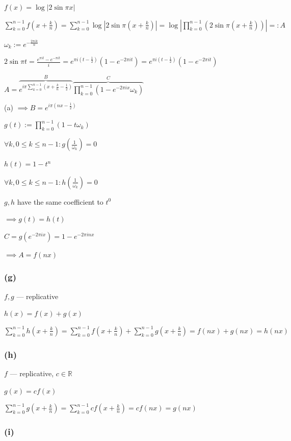 \documentclass{article}
\begin{document}
\( f(x) = \log |2 \sin \pi x | \)

\( \sum_{k=0}^{n-1} f(x+\frac{k}{n}) = \sum_{k=0}^{n-1} \log |2 \sin \pi (x + \frac{k}{n})| = \log |\prod_{k=0}^{n-1}(2\sin \pi (x + \frac{k}{n}))| =: A \)

\( \omega_{k} := e^{-\frac{2\pi i k}{n}} \)

\( 2\sin \pi t = \frac{e^{\pi i t}-e^{-\pi i t}}{i} = e^{\pi i (t - \frac{1}{2})}(1-e^{-2\pi i t}) = e^{\pi i (t - \frac{1}{2})}(1-e^{-2\pi i t}) \)

\( A = \overbrace{e^{i \pi \sum_{k=0}^{n-1}(x+\frac{k}{n}-\frac{1}{2})}}^{B} \overbrace{\prod_{k=0}^{n-1} (1-e^{-2\pi i x}\omega_{k})}^{C} \)

(a) \( \implies B = e^{i \pi (nx - \frac{1}{2})} \)

\( g(t) := \prod_{k=0}^{n-1} (1-t\omega_{k}) \)

\( \forall k, 0 \leq k \leq n - 1: g(\frac{1}{\omega_{k}}) = 0 \)

\( h(t) = 1-t^{n} \)

\( \forall k, 0 \leq k \leq n - 1: h(\frac{1}{\omega_{k}}) = 0 \)

\( g, h \) have the same coefficient to \( t^{0} \)

\( \implies g(t) = h(t) \)

\( C = g(e^{-2\pi i x}) = 1 - e^{-2\pi i n x} \)

\( \implies A = f(nx) \)

\subsubsection*{(g)}

\( f, g \) --- replicative

\( h(x) = f(x) + g(x) \)

\( \sum_{k=0}^{n-1} h(x+\frac{k}{n}) = \sum_{k=0}^{n-1} f(x+\frac{k}{n}) + \sum_{k=0}^{n-1} g(x+\frac{k}{n}) = f(nx) + g(nx) = h(nx) \)

\subsubsection*{(h)}

\( f \) --- replicative, \( c \in \mathbb{R} \)

\( g(x) = cf(x) \)

\( \sum_{k=0}^{n-1} g(x+\frac{k}{n}) = \sum_{k=0}^{n-1} cf(x+\frac{k}{n}) = cf(nx) = g(nx) \)

\subsubsection*{(i)}
\end{document}
